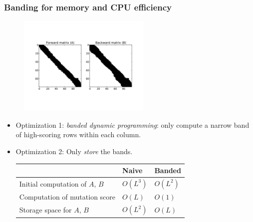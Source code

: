 \documentclass[serif,11pt]{beamer}
\begin{document}
\begin{frame}
\frametitle{Banding for memory and CPU efficiency}
\label{sec-2-9}

   \begin{figure}
   \centering
   \includegraphics[width=2.5in]{img/sparsity}
   \end{figure}

\begin{itemize}
\item Optimization 1: \emph{banded dynamic programming}: only compute a narrow band of
     high-scoring rows within each column.
\item Optimization 2: Only \emph{store} the bands.

\begin{center}
\begin{tabular}{lll}
                                  &  Naive     &  Banded    \\
\hline
 Initial computation of $A$, $B$  &  $O(L^3)$  &  $O(L^2)$  \\
 Computation of mutation score    &  $O(L)$    &  $O(1)$    \\
 Storage space for $A$, $B$       &  $O(L^2)$  &  $O(L)$    \\
\end{tabular}
\end{center}


\end{itemize}
\end{frame}
\end{document}
